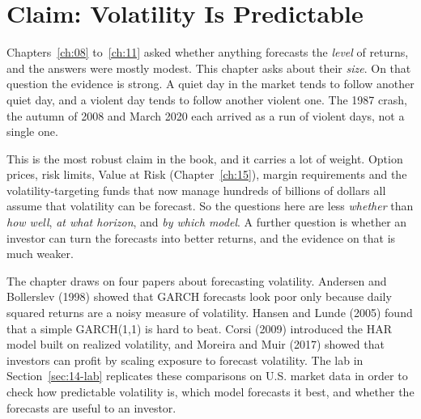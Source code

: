\makeatletter
{}
\makeatother

\chapter{Claim: Volatility Is Predictable}
\label{ch:14}

Chapters~\ref{ch:08} to~\ref{ch:11} asked whether anything forecasts the \emph{level} of returns, and the answers were mostly modest. This chapter asks about their \emph{size}. On that question the evidence is strong. A quiet day in the market tends to follow another quiet day, and a violent day tends to follow another violent one. The 1987 crash, the autumn of 2008 and March 2020 each arrived as a run of violent days, not a single one.

This is the most robust claim in the book, and it carries a lot of weight. Option prices, risk limits, Value at Risk (Chapter~\ref{ch:15}), margin requirements and the volatility-targeting funds that now manage hundreds of billions of dollars all assume that volatility can be forecast. So the questions here are less \emph{whether} than \emph{how well}, \emph{at what horizon}, and \emph{by which model}. A further question is whether an investor can turn the forecasts into better returns, and the evidence on that is much weaker.

The chapter draws on four papers about forecasting volatility. Andersen and Bollerslev (1998) showed that GARCH forecasts look poor only because daily squared returns are a noisy measure of volatility. Hansen and Lunde (2005) found that a simple GARCH(1,1) is hard to beat. Corsi (2009) introduced the HAR model built on realized volatility, and Moreira and Muir (2017) showed that investors can profit by scaling exposure to forecast volatility. The lab in Section~\ref{sec:14-lab} replicates these comparisons on U.S. market data in order to check how predictable volatility is, which model forecasts it best, and whether the forecasts are useful to an investor.

